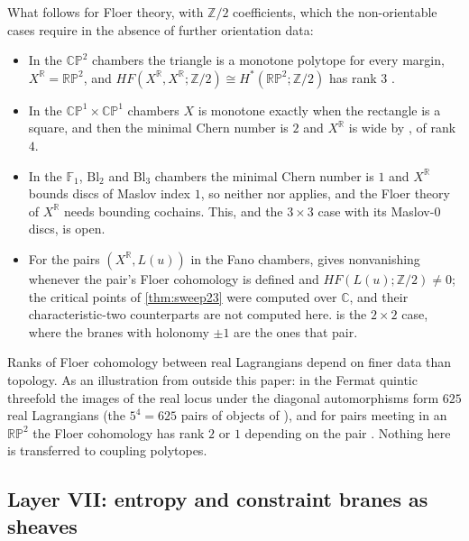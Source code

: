 \documentclass[11pt]{article}
\theoremstyle{definition}
\theoremstyle{remark}
\newcommand{\R}{\mathbb{R}}
\newcommand{\Z}{\mathbb{Z}}
\begin{document}
What follows for Floer theory, with $\Z/2$ coefficients, which the non-orientable cases require in the absence of further orientation
data:
\begin{itemize}[leftmargin=*,nosep]
\item In the $\mathbb{CP}^2$ chambers the triangle is a monotone polytope for every margin, $X^{\R}=\mathbb{RP}^2$, and
  $HF(X^{\R},X^{\R};\Z/2)\cong H^*(\mathbb{RP}^2;\Z/2)$ has rank $3$ \cite{Oh1993}.
\item In the $\mathbb{CP}^1\times\mathbb{CP}^1$ chambers $X$ is monotone exactly when the rectangle is a square, and then the minimal Chern number is
  $2$ and $X^{\R}$ is wide by \cite[Thm.~A]{Haug2013}, of rank $4$.
\item In the $\mathbb F_1$, $\mathrm{Bl}_2$ and $\mathrm{Bl}_3$ chambers the minimal Chern number is $1$ and $X^{\R}$ bounds discs of Maslov index $1$, so
  neither \cite{Oh1993} nor \cite{Haug2013} applies, and the Floer theory of $X^{\R}$ needs bounding cochains. This, and the $3\times3$ case with
  its Maslov-$0$ discs, is open.
\item For the pairs $(X^{\R},L(u))$ in the Fano chambers, \cite{AlstonAmorim2012} gives nonvanishing whenever the pair's Floer cohomology is defined and
  $HF(L(u);\Z/2)\ne0$; the critical points of \cref{thm:sweep23} were computed over $\mathbb C$, and their characteristic-two counterparts are not
  computed here.  is the $2\times2$ case, where the branes with holonomy $\pm1$ are the ones that pair.
\end{itemize}
Ranks of Floer cohomology between real Lagrangians depend on finer data than topology. As an illustration from outside this paper: in the
Fermat quintic threefold the images of the real locus under the diagonal automorphisms form $625$ real Lagrangians \cite{Alston2010} (the $5^4=625$
pairs of objects of \cite{Walcher2007}), and for pairs meeting in an $\mathbb{RP}^2$ the Floer cohomology has rank $2$ or $1$ depending on the pair
\cite{Alston2010}. Nothing here is transferred to coupling polytopes.

\subsection{Layer VII: entropy and constraint branes as sheaves}\label{sec:layerVII}
\end{document}
